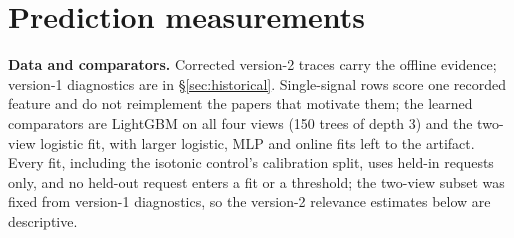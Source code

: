 \section{Prediction measurements}
\label{sec:exp}

\textbf{Data and comparators.} Corrected version-2 traces carry the offline
evidence; version-1 diagnostics are in \S\ref{sec:historical}. Single-signal rows
score one recorded feature and do not reimplement the papers that motivate them;
the learned comparators are LightGBM on all four views (150 trees of depth 3) and the
two-view logistic fit, with larger logistic, MLP and online fits left to the
artifact. Every fit, including the isotonic
control's calibration split, uses held-in requests only, and no held-out request
enters a fit or a threshold; the two-view subset was fixed from version-1
diagnostics, so the version-2 relevance estimates below are descriptive.

